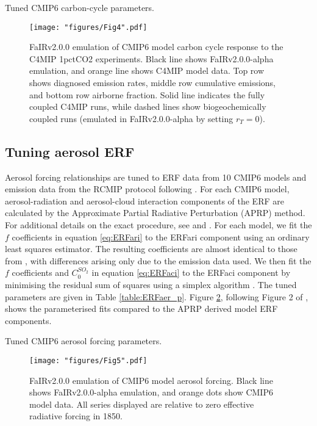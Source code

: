 \documentclass[gmd, manuscript]{copernicus}
\begin{document}
\clearpage
\begin{table}[t]
    \caption{Tuned CMIP6 carbon-cycle parameters.}
    \label{table:cc_p}
    
\end{table}
\clearpage
\begin{figure}[t]
    \texttt{[image: "figures/Fig4".pdf]}
    \caption{FaIRv2.0.0 emulation of CMIP6 model carbon cycle response to the C4MIP 1pctCO2 experiments. Black line shows FaIRv2.0.0-alpha emulation, and orange line shows C4MIP model data. Top row shows diagnosed emission rates, middle row cumulative emissions, and bottom row airborne fraction. Solid line indicates the fully coupled C4MIP runs, while dashed lines show biogeochemically coupled runs (emulated in FaIRv2.0.0-alpha by setting $r_T=0$).}
    \label{fig:cc_emulation}
\end{figure}
\clearpage
\subsection{Tuning aerosol ERF} \label{cmip6_erfaer}
Aerosol forcing relationships are tuned to ERF data from 10 CMIP6 models and emission data from the RCMIP protocol \citep{Nicholls2019} following \cite{Smith2020a}. For each CMIP6 model, aerosol-radiation and aerosol-cloud interaction components of the ERF are calculated by the Approximate Partial Radiative Perturbation (APRP) method. For additional details on the exact procedure, see \cite{Smith2020a} and \cite{Zelinka2014}. For each model, we fit the $f$ coefficients in equation \ref{eq:ERFari} to the ERFari component using an ordinary least squares estimator. The resulting coefficients are almost identical to those from \cite{Smith2020a}, with differences arising only due to the emission data used. We then fit the $f$ coefficients and $C_0^{SO_2}$ in equation \ref{eq:ERFaci} to the ERFaci component by minimising the residual sum of squares using a simplex algorithm \citep{Nelder1965}. The tuned parameters are given in Table \ref{table:ERFaer_p}. Figure \ref{fig:ERFaer_emulation}, following Figure 2 of \cite{Smith2020a}, shows the parameterised fits compared to the APRP derived model ERF components.
\clearpage
\begin{table}
    \caption{Tuned CMIP6 aerosol forcing parameters.}
    \label{table:ERFaer_p}
    
\end{table}
\clearpage
\begin{figure}[t]
    \texttt{[image: "figures/Fig5".pdf]}
    \caption{FaIRv2.0.0 emulation of CMIP6 model aerosol forcing. Black line shows FaIRv2.0.0-alpha emulation, and orange dots show CMIP6 model data. All series displayed are relative to zero effective radiative forcing in 1850.}
    \label{fig:ERFaer_emulation}
\end{figure}
\clearpage
\end{document}
